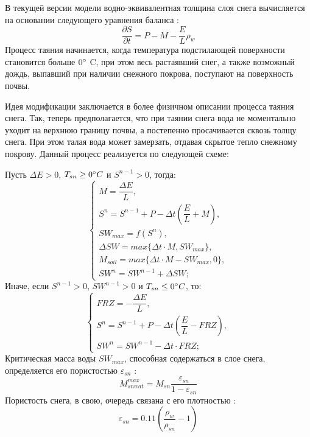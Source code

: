 \documentclass[a4paper, fontsize=14pt]{scrartcl}
\begin{document}
В текущей версии модели водно-эквивалентная толщина слоя снега вычисляется на основании следующего уравнения баланса \cite{Volodin1998, Volodina2000}:
\begin{equation}
    \dfrac{\partial S}{\partial t} = P - M - \dfrac{E}{L} \rho_w  \label{sys}
\end{equation}
Процесс таяния начинается, когда температура подстилающей поверхности становится больше $0\degree $ C, при этом весь растаявший снег, а также возможный дождь, выпавший при наличии снежного покрова, поступают на поверхность почвы.

Идея модификации заключается в более физичном описании процесса таяния снега. Так, теперь предполагается, что при таянии снега вода не моментально уходит на верхнюю границу почвы, а постепенно просачивается сквозь толщу снега. При этом талая вода может замерзать, отдавая скрытое тепло снежному покрову. Данный процесс реализуется по следующей схеме:

Пусть $\Delta E >0$, $T_{sn} \geq 0 \degree C$ и $S^{n-1} > 0$, тогда:
\begin{equation}
    \begin{cases}
        M = \dfrac{\Delta E}{L}, \\
        S^n = S^{n-1} + P - \Delta t \left( \dfrac{E}{L} + M \right), \\
        SW_{max} = f \left( S^n \right), \\
        \Delta SW = max\{\Delta t \cdot M, SW_{max}\}, \\
        M_{soil} = max\{\Delta t \cdot M - SW_{max}, 0\}, \\
        SW^n = SW^{n-1} + \Delta SW;
    \end{cases} \label{sys}    
\end{equation}
Иначе, если  $S^{n-1} > 0$, $SW^{n-1} > 0$ и $T_{sn} \leq 0 \degree C$, то:
\begin{equation}
    \begin{cases}
        FRZ = -\dfrac{\Delta E}{L}, \\
        S^n = S^{n-1} + P - \Delta t \left( \dfrac{E}{L} - FRZ \right), \\
        SW^n = SW^{n-1} - \Delta t \cdot FRZ;
    \end{cases} \label{sys}    
\end{equation}
Критическая масса воды $SW_{max}$, способная содержаться в слое снега, определяется его пористостью $\varepsilon_{sn}$ \cite{Gusev2002}:
\begin{equation}
    M_{snwat}^{max} = M_{sn}\dfrac{\varepsilon_{sn}}{1 - \varepsilon_{sn}}  \label{sys}  
\end{equation}
Пористость снега, в свою, очередь связана с его плотностью \cite{Stock}:
\begin{equation}
    \varepsilon_{sn} = 0.11 \left( \dfrac{\rho_w}{\rho_{sn}} - 1 \right)  \label{sys}  
\end{equation}
\end{document}

